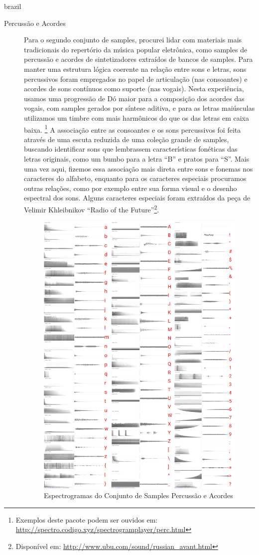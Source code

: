 \begin{otherlanguage*}{brazil}
\begin{description}
\item[Percussão e Acordes] Para o segundo conjunto de samples, procurei lidar com materiais mais tradicionais do repertório da música popular eletrônica, como samples de percussão e acordes de sintetizadores extraídos de bancos de samples. Para manter uma estrutura lógica coerente na relação entre sons e letras, sons percussivos foram empregados no papel de articulação (nas consoantes) e acordes de sons contínuos como suporte (nas vogais). Nesta experiência, usamos uma progressão de Dó maior para a composição dos acordes das vogais, com samples gerados por síntese aditiva, e para as letras maiúsculas utilizamos um timbre com mais harmônicos do que os das letras em caixa baixa. \footnote{Exemplos deste pacote podem ser ouvidos em: \url{http://spectro.codigo.xyz/spectrogramplayer/perc.html} }
A associação entre as consoantes e os sons percussivos foi feita através de uma escuta reduzida de uma coleção grande de samples, buscando identificar sons que lembrassem características fonéticas das letras originais, como um bumbo para a letra ``B'' e pratos para ``S''. Mais uma vez aqui, fizemos essa associação mais direta entre sons e fonemas nos caracteres do alfabeto, enquanto para os caracteres especiais procuramos outras relações, como por exemplo entre sua forma visual e o desenho espectral dos sons. Alguns caracteres especiais foram extraídos da peça de Velimir Khleibnikov ``Radio of the Future''\footnote{Disponível em: \url{http://www.ubu.com/sound/russian_avant.html}}.

\begin{figure}[htb]
    \caption{\label{samplespercussao}Espectrogramas do Conjunto de Samples Percussão e Acordes}
    \begin{center}
        \includegraphics[width=0.7\linewidth]{pictures/cap3/bandapercussao.jpg}
    \end{center}
\end{figure}


\end{description}
\end{otherlanguage*}
